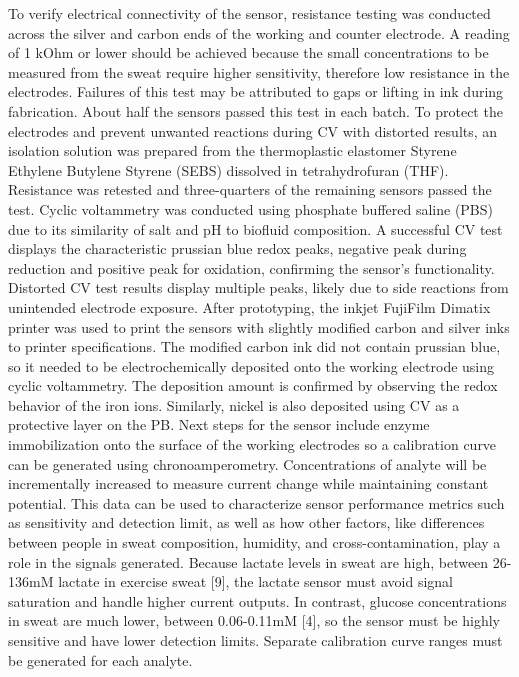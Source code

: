 \documentclass[conference]{IEEEtran}
\begin{document}
To verify electrical connectivity of the sensor, resistance testing was conducted across the silver and carbon ends of the working and counter electrode. A reading of 1 kOhm or lower should be achieved because the small concentrations to be measured from the sweat require higher sensitivity, therefore low resistance in the electrodes. Failures of this test may be attributed to gaps or lifting in ink during fabrication. About half the sensors passed this test in each batch.
To protect the electrodes and prevent unwanted reactions during CV with distorted results, an isolation solution was prepared from the thermoplastic elastomer Styrene Ethylene Butylene Styrene (SEBS) dissolved in tetrahydrofuran (THF). Resistance was retested and three-quarters of the remaining sensors passed the test. 
Cyclic voltammetry was conducted using phosphate buffered saline (PBS) due to its similarity of salt and pH to biofluid composition. A successful CV test displays the characteristic prussian blue redox peaks, negative peak during reduction and positive peak for oxidation, confirming the sensor’s functionality. Distorted CV test results display multiple peaks, likely due to side reactions from unintended electrode exposure.
After prototyping, the inkjet FujiFilm Dimatix printer was used to print the sensors with slightly modified carbon and silver inks to printer specifications. The modified carbon ink did not contain prussian blue, so it needed to be electrochemically deposited onto the working electrode using cyclic voltammetry. The deposition amount is confirmed by observing the redox behavior of the iron ions. Similarly, nickel is also deposited using CV as a protective layer on the PB. 
Next steps for the sensor include enzyme immobilization onto the surface of the working electrodes so a calibration curve can be generated using chronoamperometry. Concentrations of analyte will be incrementally increased to measure current change while maintaining constant potential. This data can be used to characterize sensor performance metrics such as sensitivity and detection limit, as well as how other factors, like differences between people in sweat composition, humidity, and cross-contamination, play a role in the signals generated. Because lactate levels in sweat are high, between 26-136mM lactate in exercise sweat [9], the lactate sensor must avoid signal saturation and handle higher current outputs. In contrast, glucose concentrations in sweat are much lower, between 0.06-0.11mM [4], so the sensor must be highly sensitive and have lower detection limits. Separate calibration curve ranges must be generated for each analyte.
\end{document}
